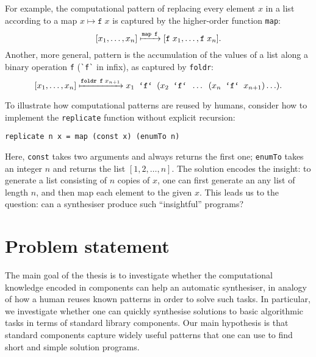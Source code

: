 For example, the computational pattern of replacing every element $x$ in a list according to a map $x \mapsto \texttt{f} \; x$ is captured by the higher-order function \lstinline!map!:
\[ [x_1, \dots, x_n] \xmapsto{\texttt{map f}} [\texttt{f} \; x_1, \dots, \texttt{f} \; x_n]. \]
Another, more general, pattern is the accumulation of the values of a list along a binary operation \lstinline!f! (\lstinline!`f`! in infix), as captured by \lstinline!foldr!:
\[ [x_1, \dots, x_n] \xmapsto{\texttt{foldr f} \; x_{n+1}} x_1 \texttt{ `f` } (x_2 \texttt{ `f` } \dots \texttt{ } (x_n \texttt{ `f` } x_{n+1})\ldots). \] 


To illustrate how computational patterns are reused by humans, consider how to implement the \lstinline!replicate! function without explicit recursion:
\begin{lstlisting}[style=plain]
replicate n x = map (const x) (enumTo n)
\end{lstlisting}
Here, \lstinline!const! takes two arguments and always returns the first one; \lstinline!enumTo! takes an integer $n$ and returns the list $[1, 2, \ldots, n]$.  The solution encodes the insight: to generate a list consisting of $n$ copies of $x$, one can first generate an any list of length $n$, and then map each element to the given $x$.  This leads us to the question: can a synthesiser produce such ``insightful'' programs?

\section{Problem statement}

The main goal of the thesis is to investigate whether the computational knowledge encoded in components can help an automatic synthesiser, in analogy of how a human reuses known patterns in order to solve such tasks.  In particular, we investigate whether one can quickly synthesise solutions to basic algorithmic tasks in terms of standard library components.  Our main hypothesis is that standard components capture widely useful patterns that one can use to find short and simple solution programs.

